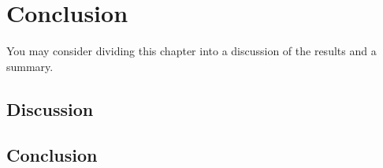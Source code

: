\chapter{Conclusion}

You may consider dividing this chapter into a discussion of the results and a summary. 

\section{Discussion}

\section{Conclusion}
